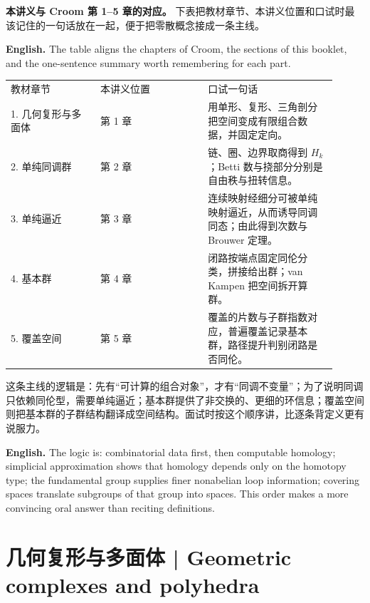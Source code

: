 \documentclass[UTF8,11pt,a4paper]{ctexart}
\newcommand{\EN}[1]{\par\noindent\textbf{English.} #1\par}
\begin{document}
\noindent\textbf{本讲义与 Croom 第 1--5 章的对应。} 下表把教材章节、本讲义位置和口试时最该记住的一句话放在一起，便于把零散概念接成一条主线。
\EN{The table aligns the chapters of Croom, the sections of this booklet, and the one-sentence summary worth remembering for each part.}
\begin{center}
\small
\begin{tabular}{p{0.25\linewidth}p{0.3\linewidth}p{0.36\linewidth}}
教材章节 & 本讲义位置 & 口试一句话\\
1. 几何复形与多面体 & 第 1 章 & 用单形、复形、三角剖分把空间变成有限组合数据，并固定定向。\\
2. 单纯同调群 & 第 2 章 & 链、圈、边界取商得到 $H_k$；Betti 数与挠部分分别是自由秩与扭转信息。\\
3. 单纯逼近 & 第 3 章 & 连续映射经细分可被单纯映射逼近，从而诱导同调同态；由此得到次数与 Brouwer 定理。\\
4. 基本群 & 第 4 章 & 闭路按端点固定同伦分类，拼接给出群；van Kampen 把空间拆开算群。\\
5. 覆盖空间 & 第 5 章 & 覆盖的片数与子群指数对应，普遍覆盖记录基本群，路径提升判别闭路是否同伦。\\
\end{tabular}
\end{center}
\noindent 这条主线的逻辑是：先有“可计算的组合对象”，才有“同调不变量”；为了说明同调只依赖同伦型，需要单纯逼近；基本群提供了非交换的、更细的环信息；覆盖空间则把基本群的子群结构翻译成空间结构。面试时按这个顺序讲，比逐条背定义更有说服力。
\EN{The logic is: combinatorial data first, then computable homology; simplicial approximation shows that homology depends only on the homotopy type; the fundamental group supplies finer nonabelian loop information; covering spaces translate subgroups of that group into spaces. This order makes a more convincing oral answer than reciting definitions.}

\section{几何复形与多面体 | Geometric complexes and polyhedra}
\end{document}
